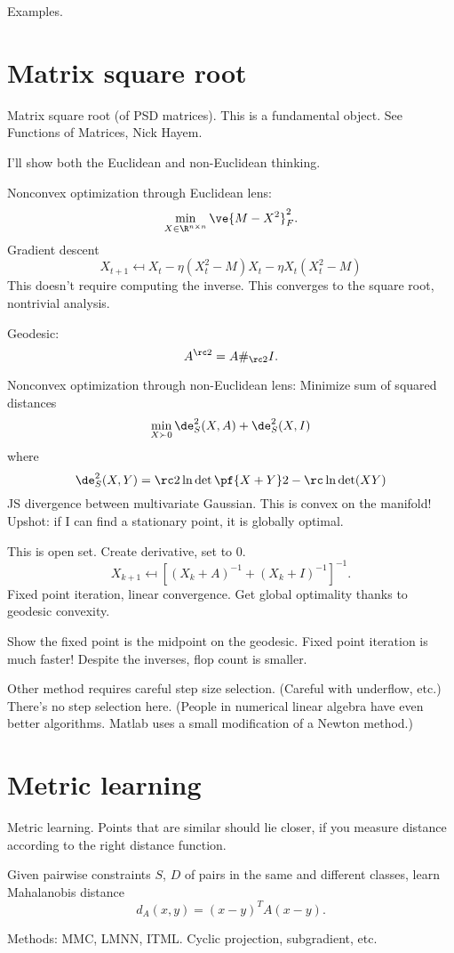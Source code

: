 Examples.

\section{Matrix square root}

Matrix square root (of PSD matrices). This is a fundamental object. See Functions of Matrices, Nick Hayem.

I'll show both the Euclidean and non-Euclidean thinking.

Nonconvex optimization through Euclidean lens:
$$
\min_{X\in \R^{n\times n}} \ve{M-X^2}_F^2.
$$
Gradient descent
$$
X_{t+1}\mapsfrom X_{t}-\eta (X_t^2 -M)X_t - \eta X_t(X_t^2-M)
$$
This doesn't require computing the inverse. This converges to the square root, nontrivial analysis.

Geodesic:
$$
A^{\rc 2} = A\#_{\rc 2}I.
$$

Nonconvex optimization through non-Euclidean lens: Minimize sum of squared distances
$$
\min_{X\succ 0}
\de_S^2(X,A) + \de_S^2(X,I)
$$
where
$$
\de_S^2(X,Y) = \rc 2 \ln \det \pf{X+Y}2 - \rc \ln \det(XY)
$$
JS divergence between multivariate Gaussian. This is convex on the manifold!
Upshot: if I can find a stationary point, it is globally optimal.

This is open set. Create derivative, set to 0.
$$
X_{k+1}\mapsfrom [(X_k+A)^{-1} + (X_k+I)^{-1}]^{-1}.
$$
Fixed point iteration, linear convergence. Get global optimality thanks to geodesic convexity.

Show the fixed point is the midpoint on the geodesic. Fixed point iteration is much faster!
Despite the inverses, flop count is smaller.

Other method requires careful step size selection. (Careful with underflow, etc.) There's no step selection here. (People in numerical linear algebra have even better algorithms. Matlab uses a small modification of a Newton method.)

\section{Metric learning}
Metric learning. Points that are similar should lie closer, if you measure distance according to the right distance function.

Given pairwise constraints
$S$, $D$ of pairs in the same and different classes, 
 learn Mahalanobis distance
$$
d_A(x,y) = (x-y)^T A (x-y).
$$

Methods: MMC, LMNN, ITML. Cyclic projection, subgradient, etc.

